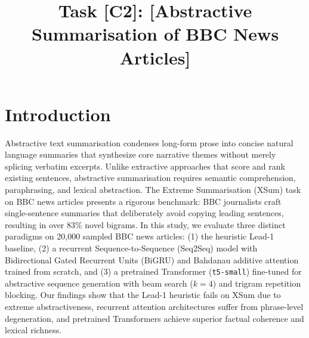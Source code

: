 \documentclass[conference]{IEEEtran}
\begin{document}
\title{Task [C2]: [Abstractive Summarisation of BBC News Articles]}

\author{
}

\maketitle

\section{Introduction}
Abstractive text summarisation condenses long-form prose into concise natural language summaries that synthesize core narrative themes without merely splicing verbatim excerpts. Unlike extractive approaches that score and rank existing sentences, abstractive summarisation requires semantic comprehension, paraphrasing, and lexical abstraction. The Extreme Summarisation (XSum) task on BBC news articles presents a rigorous benchmark: BBC journalists craft single-sentence summaries that deliberately avoid copying leading sentences, resulting in over 83\% novel bigrams. In this study, we evaluate three distinct paradigms on 20,000 sampled BBC news articles: (1) the heuristic Lead-1 baseline, (2) a recurrent Sequence-to-Sequence (Seq2Seq) model with Bidirectional Gated Recurrent Units (BiGRU) and Bahdanau additive attention trained from scratch, and (3) a pretrained Transformer (\texttt{t5-small}) fine-tuned for abstractive sequence generation with beam search ($k=4$) and trigram repetition blocking. Our findings show that the Lead-1 heuristic fails on XSum due to extreme abstractiveness, recurrent attention architectures suffer from phrase-level degeneration, and pretrained Transformers achieve superior factual coherence and lexical richness.
\end{document}
